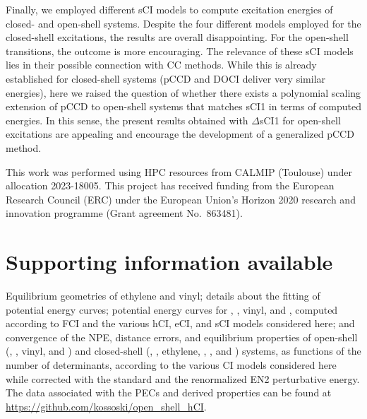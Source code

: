 \documentclass[aip,jcp,reprint,noshowkeys,superscriptaddress]{revtex4-1}
\begin{document}
Finally, we employed different sCI models to compute excitation energies of closed- and open-shell systems.
Despite the four different models employed for the closed-shell excitations, the results are overall disappointing.
For the open-shell transitions, the outcome is more encouraging.
The relevance of these sCI models lies in their possible connection with CC methods.
While this is already established for closed-shell systems (pCCD and DOCI deliver very similar energies), \cite{Bytautas_2011,Allen_1962,Smith_1965,Veillard_1967,Kossoski_2021,Marie_2021}
here we raised the question of whether there exists a polynomial scaling extension of pCCD to open-shell systems that matches sCI1 in terms of computed energies.
In this sense, the present results obtained with $\Delta$sCI1 for open-shell excitations are appealing and encourage the development of a generalized pCCD method.

\begin{acknowledgements}
This work was performed using HPC resources from CALMIP (Toulouse) under allocation 2023-18005.
This project has received funding from the European Research Council (ERC) under the European Union's Horizon 2020 research and innovation programme (Grant agreement No.~863481).
\end{acknowledgements}

\section*{Supporting information available}
\label{sec:SI}

Equilibrium geometries of ethylene and vinyl; details about the fitting of potential energy curves;
potential energy curves for , , vinyl, and ,
computed according to FCI and the various hCI, eCI, and sCI models considered here;
and convergence of the NPE, distance errors, and equilibrium properties of
open-shell (, , vinyl, and )
and closed-shell (, , ethylene, , , and ) systems,
as functions of the number of determinants, according to the various CI models considered here while
corrected with the standard and the renormalized EN2 perturbative energy.
The data associated with the PECs and derived properties can be found at \url{https://github.com/kossoski/open_shell_hCI}.
\end{document}
